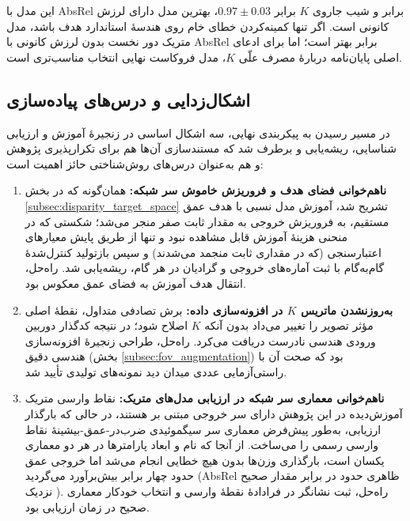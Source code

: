 این مدل با AbsRel برابر  و شیب جاروی $K$ برابر $0.97\pm0.03$، بهترین مدل دارای لرزش کانونی است. اگر تنها کمینه‌کردن خطای خام روی هندسهٔ استاندارد  هدف باشد، مدل متریک دور نخست بدون لرزش کانونی با AbsRel برابر  بهتر است؛ اما برای ادعای اصلی پایان‌نامه دربارهٔ مصرف علّی $K$، مدل فروکاست نهایی انتخاب مناسب‌تری است.
\subsection{اشکال‌زدایی و درس‌های پیاده‌سازی}
\label{subsec:debugging_lessons}

در مسیر رسیدن به پیکربندی نهایی، سه اشکال اساسی در زنجیرهٔ آموزش و ارزیابی شناسایی، ریشه‌یابی و برطرف شد که مستندسازی آن‌ها هم برای تکرارپذیری پژوهش و هم به‌عنوان درس‌های روش‌شناختی حائز اهمیت است:

\begin{enumerate}
    \item \textbf{ناهم‌خوانی فضای هدف و فروریزش خاموش سر شبکه:} همان‌گونه که در بخش \ref{subsec:disparity_target_space} تشریح شد، آموزش مدل نسبی با هدف عمق مستقیم، به فروریزش خروجی به مقدار ثابت صفر منجر می‌شد؛ شکستی که در منحنی هزینهٔ آموزش قابل مشاهده نبود و تنها از طریق پایش معیارهای اعتبارسنجی (که در مقداری ثابت منجمد می‌شدند) و سپس بازتولید کنترل‌شدهٔ گام‌به‌گام با ثبت آماره‌های خروجی و گرادیان در هر گام، ریشه‌یابی شد. راه‌حل، انتقال هدف آموزش به فضای عمق معکوس بود.
    \item \textbf{به‌روزنشدن ماتریس $K$ در افزونه‌سازی داده:} برش تصادفی متداول، نقطهٔ اصلی مؤثر تصویر را تغییر می‌داد بدون آنکه $K$ اصلاح شود؛ در نتیجه کدگذار دوربین ورودی هندسی نادرست دریافت می‌کرد. راه‌حل، طراحی زنجیرهٔ افزونه‌سازی هندسی دقیق (بخش \ref{subsec:fov_augmentation}) بود که صحت آن با راستی‌آزمایی عددی میدان دید نمونه‌های تولیدی تأیید شد.
    \item \textbf{ناهم‌خوانی معماری سر شبکه در ارزیابی مدل‌های متریک:} نقاط وارسی متریک آموزش‌دیده در این پژوهش دارای سر خروجی مبتنی بر  هستند، در حالی که بارگذار ارزیابی، به‌طور پیش‌فرض معماری سر سیگموئیدی ضرب‌در-عمق-بیشینهٔ نقاط وارسی رسمی را می‌ساخت. از آنجا که نام و ابعاد پارامترها در هر دو معماری یکسان است، بارگذاری وزن‌ها بدون هیچ خطایی انجام می‌شد اما خروجی عمق حدود چهار برابر بیش‌برآورد می‌گردید (AbsRel ظاهری حدود  در برابر مقدار صحیح نزدیک ). راه‌حل، ثبت نشانگر  در فرادادهٔ نقطهٔ وارسی و انتخاب خودکار معماری صحیح در زمان ارزیابی بود.
\end{enumerate}

